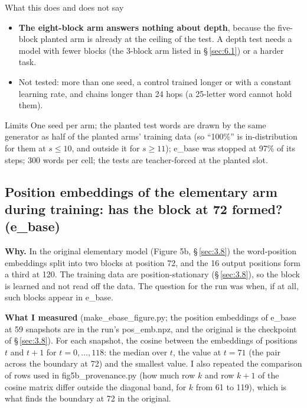 \documentclass[paper=a4,fontsize=11pt,DIV=11,parskip=half,headings=small,numbers=noendperiod]{scrartcl}
\DeclareRobustCommand{\lead}[1]{\textsf{\bfseries\color{accent}#1}}
\DeclareRobustCommand{\code}[1]{{\fontseries{m}\ttfamily #1}}
\begin{document}
\begin{findbox}{What this does and does not say}
\begin{itemize}
  five blocks together with natural words over 10 points as such; it does not say which of these differences
  made the original’s cliff.
\item \lead{The eight-block arm answers nothing about depth}, because the five-block planted arm is already at
  the ceiling of the test. A depth test needs a model with fewer blocks (the 3-block arm listed in
  \S\,\ref{sec:6.1}) or a harder task.
\item Not tested: more than one seed, a control trained longer or with a constant learning rate, and chains
  longer than 24 hops (a 25-letter word cannot hold them).
\end{itemize}
\end{findbox}

\begin{limbox}{Limits}
One seed per arm; the planted test words are drawn by the same generator as half of the planted arms’ training
data (so “100\%” is in-distribution for them at $s\le10$, and outside it for $s\ge11$);
\code{e\_\allowbreak{}base} was stopped at 97\% of its steps; 300 words per cell; the tests are teacher-forced
at the planted slot.
\end{limbox}

\subsection{Position embeddings of the elementary arm during training: has the block at 72 formed?
(\texorpdfstring{\code{e\_\allowbreak{}base}}{e_base})}\label{sec:3.15}
\lead{Why.} In the original elementary model (Figure 5b, \S\,\ref{sec:3.8}) the word-position embeddings split
into two blocks at position 72, and the 16 output positions form a third at 120. The training data are
position-stationary (\S\,\ref{sec:3.8}), so the block is learned and not read off the data. The question for the
run was when, if at all, such blocks appear in \code{e\_\allowbreak{}base}.

\lead{What I measured} (\code{make\_\allowbreak{}ebase\_\allowbreak{}figure.\allowbreak{}py}; the position
embeddings of \code{e\_\allowbreak{}base} at 59 snapshots are in the run’s
\code{pos\_\allowbreak{}emb.\allowbreak{}npz}, and the original is the checkpoint of \S\,\ref{sec:3.8}). For
each snapshot, the cosine between the embeddings of positions $t$ and $t+1$ for $t=0,\dots,118$: the median over
$t$, the value at $t=71$ (the pair across the boundary at 72) and the smallest value. I also repeated the
comparison of rows used in \code{fig5b\_\allowbreak{}provenance.\allowbreak{}py} (how much row $k$ and row $k+1$
of the cosine matrix differ outside the diagonal band, for $k$ from 61 to 119), which is what finds the boundary
at 72 in the original.
\end{document}
